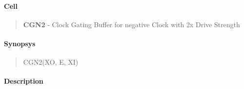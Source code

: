 \label{CGN2}
\paragraph{Cell}
\begin{quote}
    \textbf{CGN2} - Clock Gating Buffer for negative Clock with 2x Drive Strength
\end{quote}

\paragraph{Synopsys}
\begin{quote}
    CGN2(XO, E, XI)
\end{quote}

\paragraph{Description}

%

%

